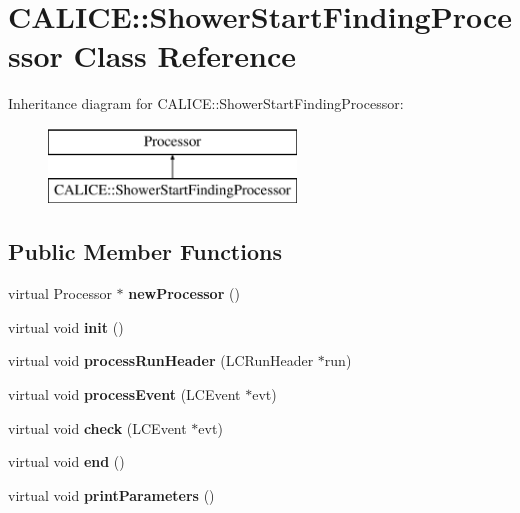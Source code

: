 \section{C\-A\-L\-I\-C\-E\-:\-:Shower\-Start\-Finding\-Processor Class Reference}
\label{classCALICE_1_1ShowerStartFindingProcessor}
Inheritance diagram for C\-A\-L\-I\-C\-E\-:\-:Shower\-Start\-Finding\-Processor\-:\begin{figure}[H]
\begin{center}
\leavevmode
\includegraphics[height=2.000000cm]{classCALICE_1_1ShowerStartFindingProcessor}
\end{center}
\end{figure}
\subsection*{Public Member Functions}
\begin{DoxyCompactItemize}
\item 
virtual Processor $\ast$ {\bfseries new\-Processor} ()\label{classCALICE_1_1ShowerStartFindingProcessor_a9979ef5ecce85c879ecf7157ad335f58}

\item 
virtual void {\bfseries init} ()\label{classCALICE_1_1ShowerStartFindingProcessor_a7b7a9d43bdf70d4193f47581f25d17d8}

\item 
virtual void {\bfseries process\-Run\-Header} (L\-C\-Run\-Header $\ast$run)\label{classCALICE_1_1ShowerStartFindingProcessor_ace5d5ba7c39f51105b227fa72b953042}

\item 
virtual void {\bfseries process\-Event} (L\-C\-Event $\ast$evt)\label{classCALICE_1_1ShowerStartFindingProcessor_a20017eb87e4d5e1d536b67ae3f329ebb}

\item 
virtual void {\bfseries check} (L\-C\-Event $\ast$evt)\label{classCALICE_1_1ShowerStartFindingProcessor_a4fb687725d5e96acb2081bf67576e133}

\item 
virtual void {\bfseries end} ()\label{classCALICE_1_1ShowerStartFindingProcessor_afb3a8ab953345eb81b7586e4838fa429}

\item 
virtual void {\bfseries print\-Parameters} ()\label{classCALICE_1_1ShowerStartFindingProcessor_ab183bd3b80736e55b060a114b98a8abb}

\end{DoxyCompactItemize}
